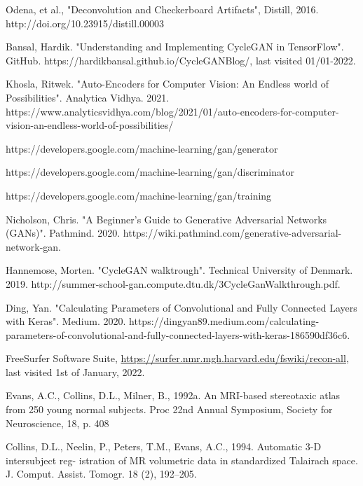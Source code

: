 \documentclass[12pt, fleqn, titlepage]{article}
\begin{document}
\begin{thebibliography}{9}
		 Odena, et al., "Deconvolution and Checkerboard Artifacts", Distill, 2016. http://doi.org/10.23915/distill.00003
		
		 Bansal, Hardik. "Understanding and Implementing CycleGAN in TensorFlow". GitHub. https://hardikbansal.github.io/CycleGANBlog/, last visited 01/01-2022.
		
		 Khosla, Ritwek. "Auto-Encoders for Computer Vision: An Endless world of Possibilities". Analytica Vidhya. 2021. https://www.analyticsvidhya.com/blog/2021/01/auto-encoders-for-computer-vision-an-endless-world-of-possibilities/
		
		 https://developers.google.com/machine-learning/gan/generator %
		
		 https://developers.google.com/machine-learning/gan/discriminator %
		
		 https://developers.google.com/machine-learning/gan/training %
		
		 Nicholson, Chris. "A Beginner's Guide to Generative Adversarial Networks (GANs)". Pathmind. 2020. https://wiki.pathmind.com/generative-adversarial-network-gan.
		
		 Hannemose, Morten. "CycleGAN walktrough". Technical University of Denmark. 2019. http://summer-school-gan.compute.dtu.dk/3CycleGanWalkthrough.pdf.
		
		 Ding, Yan. "Calculating Parameters of Convolutional and Fully Connected Layers with Keras". Medium. 2020. https://dingyan89.medium.com/calculating-parameters-of-convolutional-and-fully-connected-layers-with-keras-186590df36c6.

		 FreeSurfer Software Suite, \url{https://surfer.nmr.mgh.harvard.edu/fswiki/recon-all}, last visited 1st of January, 2022.
		
		 Evans, A.C., Collins, D.L., Milner, B., 1992a. An MRI-based stereotaxic atlas from 250 young normal subjects. Proc 22nd Annual Symposium, Society for Neuroscience, 18, p. 408
		
		 Collins, D.L., Neelin, P., Peters, T.M., Evans, A.C., 1994. Automatic 3-D intersubject reg- istration of MR volumetric data in standardized Talairach space. J. Comput. Assist. Tomogr. 18 (2), 192–205.
		

\end{thebibliography}
\end{document}
